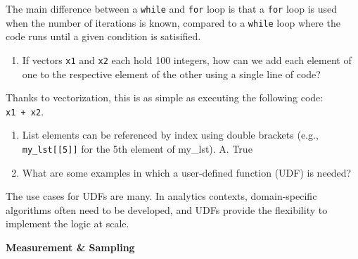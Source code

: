 \documentclass[]{book}
\providecommand{\tightlist}{%
  \setlength{\itemsep}{0pt}\setlength{\parskip}{0pt}}
\begin{document}
The main difference between a \texttt{while} and \texttt{for} loop is that a \texttt{for} loop is used when the number of iterations is known, compared to a \texttt{while} loop where the code runs until a given condition is satisified.

\begin{enumerate}
\def\labelenumi{\arabic{enumi}.}
\setcounter{enumi}{7}
\tightlist
\item
  If vectors \texttt{x1} and \texttt{x2} each hold 100 integers, how can we add each element of one to the respective element of the other using a single line of code?
\end{enumerate}

Thanks to vectorization, this is as simple as executing the following code: \texttt{x1\ +\ x2}.

\begin{enumerate}
\def\labelenumi{\arabic{enumi}.}
\setcounter{enumi}{8}
\item
  List elements can be referenced by index using double brackets (e.g., \texttt{my\_lst{[}{[}5{]}{]}} for the 5th element of my\_lst).
  A. True
\item
  What are some examples in which a user-defined function (UDF) is needed?
\end{enumerate}

The use cases for UDFs are many. In analytics contexts, domain-specific algorithms often need to be developed, and UDFs provide the flexibility to implement the logic at scale.

\textbf{Measurement \& Sampling}
\end{document}
